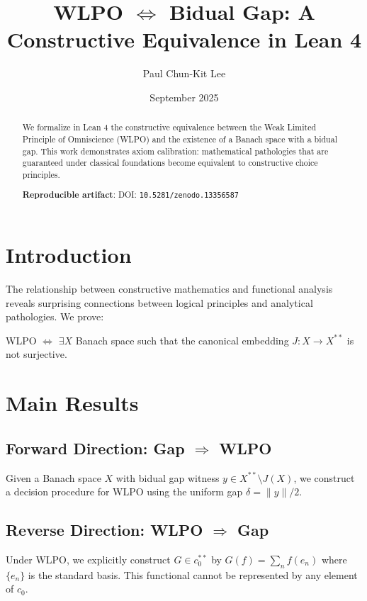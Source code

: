 \documentclass{article}
\title{WLPO $\Leftrightarrow$ Bidual Gap: A Constructive Equivalence in Lean 4}
\author{Paul Chun-Kit Lee}
\date{September 2025}
\begin{document}
\maketitle

\begin{abstract}
We formalize in Lean 4 the constructive equivalence between the Weak Limited Principle of Omniscience (WLPO) and the existence of a Banach space with a bidual gap. This work demonstrates axiom calibration: mathematical pathologies that are guaranteed under classical foundations become equivalent to constructive choice principles.

\textbf{Reproducible artifact}: DOI: \texttt{10.5281/zenodo.13356587}
\end{abstract}

\section{Introduction}

The relationship between constructive mathematics and functional analysis reveals surprising connections between logical principles and analytical pathologies. We prove:

\begin{theorem}
WLPO $\Leftrightarrow$ $\exists X$ Banach space such that the canonical embedding $J: X \to X^{**}$ is not surjective.
\end{theorem}

\section{Main Results}

\subsection{Forward Direction: Gap $\Rightarrow$ WLPO}

Given a Banach space $X$ with bidual gap witness $y \in X^{**} \setminus J(X)$, we construct a decision procedure for WLPO using the uniform gap $\delta = \|y\|/2$.

\subsection{Reverse Direction: WLPO $\Rightarrow$ Gap}

Under WLPO, we explicitly construct $G \in c_0^{**}$ by $G(f) = \sum_n f(e_n)$ where $\{e_n\}$ is the standard basis. This functional cannot be represented by any element of $c_0$.
\end{document}

